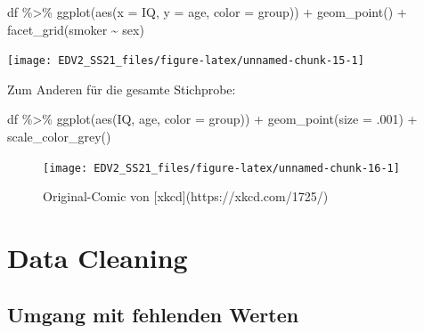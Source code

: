 \documentclass[
]{book}
\newenvironment{Shaded}{\begin{snugshade}}{\end{snugshade}}
\newcommand{\AttributeTok}[1]{\textcolor[rgb]{0.77,0.63,0.00}{#1}}
\newcommand{\DecValTok}[1]{\textcolor[rgb]{0.00,0.00,0.81}{#1}}
\newcommand{\FunctionTok}[1]{\textcolor[rgb]{0.00,0.00,0.00}{#1}}
\newcommand{\NormalTok}[1]{#1}
\newcommand{\SpecialCharTok}[1]{\textcolor[rgb]{0.00,0.00,0.00}{#1}}
\begin{document}
\begin{Shaded}
\begin{Highlighting}[]
\NormalTok{df }\SpecialCharTok{\%\textgreater{}\%} 
  \FunctionTok{ggplot}\NormalTok{(}\FunctionTok{aes}\NormalTok{(}\AttributeTok{x =}\NormalTok{ IQ, }
             \AttributeTok{y =}\NormalTok{ age, }
             \AttributeTok{color =}\NormalTok{ group)) }\SpecialCharTok{+}
  \FunctionTok{geom\_point}\NormalTok{() }\SpecialCharTok{+}
  \FunctionTok{facet\_grid}\NormalTok{(smoker }\SpecialCharTok{\textasciitilde{}}\NormalTok{ sex)}
\end{Highlighting}
\end{Shaded}

\begin{center}\texttt{[image: EDV2\_SS21\_files/figure-latex/unnamed-chunk-15-1]} \end{center}

Zum Anderen für die gesamte Stichprobe:

\begin{Shaded}
\begin{Highlighting}[]
\NormalTok{df }\SpecialCharTok{\%\textgreater{}\%} 
  \FunctionTok{ggplot}\NormalTok{(}\FunctionTok{aes}\NormalTok{(IQ, age, }\AttributeTok{color =}\NormalTok{ group)) }\SpecialCharTok{+}
  \FunctionTok{geom\_point}\NormalTok{(}\AttributeTok{size =}\NormalTok{ .}\DecValTok{001}\NormalTok{) }\SpecialCharTok{+}
  \FunctionTok{scale\_color\_grey}\NormalTok{()}
\end{Highlighting}
\end{Shaded}

\begin{figure}

{\centering \texttt{[image: EDV2\_SS21\_files/figure-latex/unnamed-chunk-16-1]} 

}

\caption{Original-Comic von [xkcd](https://xkcd.com/1725/)}\label{fig:unnamed-chunk-16}
\end{figure}

\hypertarget{data-cleaning}{%
\section{Data Cleaning}\label{data-cleaning}}

\hypertarget{umgang-mit-fehlenden-werten}{%
\subsection{Umgang mit fehlenden Werten}\label{umgang-mit-fehlenden-werten}}
\end{document}

